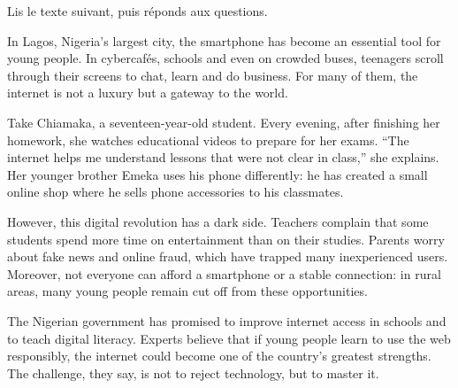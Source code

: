 \documentclass[11pt]{article}
\begin{document}
\begin{exercice}
Lis le texte suivant, puis réponds aux questions.

\begin{textebox}
In Lagos, Nigeria's largest city, the smartphone has become an essential tool for young people. In cybercafés, schools and even on crowded buses, teenagers scroll through their screens to chat, learn and do business. For many of them, the internet is not a luxury but a gateway to the world.

Take Chiamaka, a seventeen-year-old student. Every evening, after finishing her homework, she watches educational videos to prepare for her exams. “The internet helps me understand lessons that were not clear in class,” she explains. Her younger brother Emeka uses his phone differently: he has created a small online shop where he sells phone accessories to his classmates.

However, this digital revolution has a dark side. Teachers complain that some students spend more time on entertainment than on their studies. Parents worry about fake news and online fraud, which have trapped many inexperienced users. Moreover, not everyone can afford a smartphone or a stable connection: in rural areas, many young people remain cut off from these opportunities.

The Nigerian government has promised to improve internet access in schools and to teach digital literacy. Experts believe that if young people learn to use the web responsibly, the internet could become one of the country's greatest strengths. The challenge, they say, is not to reject technology, but to master it.
\end{textebox}


\end{exercice}
\end{document}
